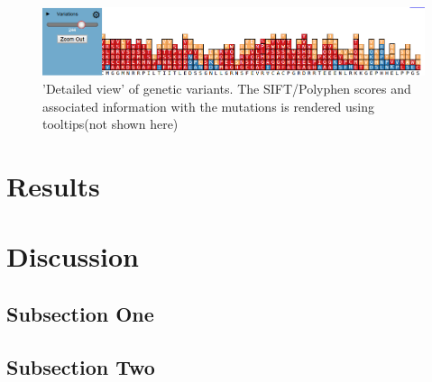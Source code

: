 \documentclass[twoside]{article}
\begin{document}
\begin{multicols}{2}
\begin{figure}
\includegraphics[width=\linewidth]{zoomed0}
\caption{'Detailed view' of genetic variants. The SIFT/Polyphen scores and associated information with the mutations is rendered using tooltips(not shown here)}
\end{figure}




\section{Results}




\section{Discussion}

\subsection{Subsection One}



\subsection{Subsection Two}










\end{multicols}
\end{document}
